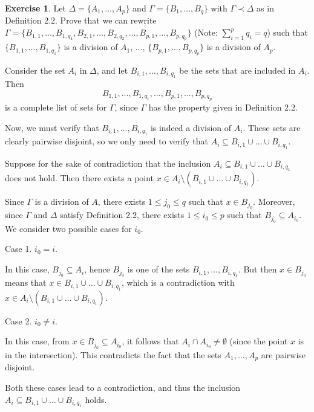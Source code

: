 \documentclass[11pt]{article}
\makeatletter
\theoremstyle{definition}
\newtheorem{exercise}[thm]{Exercise}
\newenvironment{pf}[1][\proofname]{\par
  \pushQED{\qed}%
  \normalfont \topsep0\p@\relax
  \trivlist
  \item[\hskip\labelsep\itshape
  #1\@addpunct{.}]\ignorespaces
}{%
  \popQED\endtrivlist\@endpefalse
}
\makeatother
\begin{document}
\begin{exercise}
Let $\Delta = \{A_1, \dots, A_p\}$ and $\Gamma = \{B_1, \dots, B_q\}$ with $\Gamma \prec \Delta$ as in Definition 2.2. Prove that we can rewrite $\Gamma = \{B_{1,1}, \dots, B_{1, q_1}, B_{2, 1}, \dots, B_{2, q_2}, \dots, B_{p, 1}, \dots, B_{p, q_p}\}$ (Note: $\sum_{i=1}^p q_i = q$) such that $\{B_{1, 1}, \dots, B_{1, q_1}\}$ is a division of $A_1$, $\dots$, $\{B_{p, 1}, \dots, B_{p, q_p}\}$ is a division of $A_p$.
\end{exercise}
\begin{pf}
Consider the set $A_i$ in $\Delta$, and let $B_{i,1}, \dots, B_{i, q_1}$ be the sets that are included in $A_i$. Then
$$B_{1,1}, \dots, B_{1, q_1}, \dots, B_{p,1}, \dots, B_{p, q_p}$$
is a complete list of sets for $\Gamma$, since $\Gamma$ has the property given in Definition 2.2.

Now, we must verify that $B_{i,1}, \dots, B_{i, q_1}$ is indeed a division of $A_i$. These sets are clearly pairwise disjoint, so we only need to verify that $A_i \subseteq B_{i,1} \cup \dots \cup B_{i, q_1}$. 

Suppose for the sake of contradiction that the inclusion $A_i \subseteq B_{i,1} \cup \dots \cup B_{i, q_1}$ does not hold. Then there exists a point $x \in A_i \setminus (B_{i,1} \cup \dots \cup B_{i, q_1})$. 

Since $\Gamma$ is a division of $A$, there exists $1 \leq j_0 \leq q$ such that $x \in B_{j_0}$. Moreover, since $\Gamma$ and $\Delta$ satisfy Definition 2.2, there exists $1 \leq i_0 \leq p$ such that $B_{j_0} \subseteq A_{i_0}$. We consider two possible cases for $i_0$.

{\sc Case 1.} $i_0 = i$.

In this case, $B_{j_0} \subseteq A_i$, hence $B_{j_0}$ is one of the sets $B_{i,1}, \dots, B_{i, q_1}$. But then $x \in B_{j_0}$ means that $x \in B_{i,1} \cup \dots \cup B_{i, q_1}$, which is a contradiction with $x \in A_i \setminus (B_{i,1} \cup \dots \cup B_{i, q_1})$.

{\sc Case 2.} $i_0 \neq i$.

In this case, from $x \in B_{j_0} \subseteq A_{i_0}$, it follows that $A_i \cap A_{i_0} \neq \emptyset$ (since the point $x$ is in the intersection). This contradicts the fact that the sets $A_1, \dots, A_p$ are pairwise disjoint. 

Both these cases lead to a contradiction, and thus the inclusion $A_i \subseteq B_{i,1} \cup \dots \cup B_{i, q_1}$ holds.
\end{pf}
\end{document}
